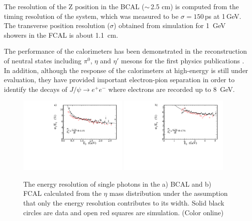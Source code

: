 The resolution of the Z position in the BCAL ($\sim$\,2.5 cm) is computed from the timing resolution of the system, which was measured to be $\sigma=150$\,ps at 1\,GeV. The transverse position resolution ($\sigma$) obtained from simulation for 1~GeV showers in the FCAL is about 1.1~cm.

The performance of the calorimeters has been demonstrated in the reconstruction of neutral states including $\pi^0$, $\eta$ and $\eta'$ mesons for the first \gx{} physics publications \cite{AlGhoul:2017nbp,Adhikari:2019gfa}. In addition, although the response of the calorimeters at high-energy is still under evaluation, they have provided important electron-pion separation in order to identify the decays of $J/\psi\rightarrow e^+e^-$ \cite{Ali:2019lzf} where electrons are recorded up to 8~GeV. 

\begin{figure}[tbh]\centering
\includegraphics[width=0.48\textwidth]{figures/fit_BCAL_energy_resolution_sigma.pdf} \includegraphics[width=0.48\textwidth]{figures/fit_FCAL_energy_resolution_sigma.pdf}
\caption{\label{fig:bcal:eta_resolution} 
The energy resolution of single photons in the a) BCAL and b) FCAL calculated from the $\eta$ mass distribution under the assumption that only the energy resolution contributes to its width.  Solid black circles are data and open red squares are simulation.
(Color online)
 }
\end{figure}    


